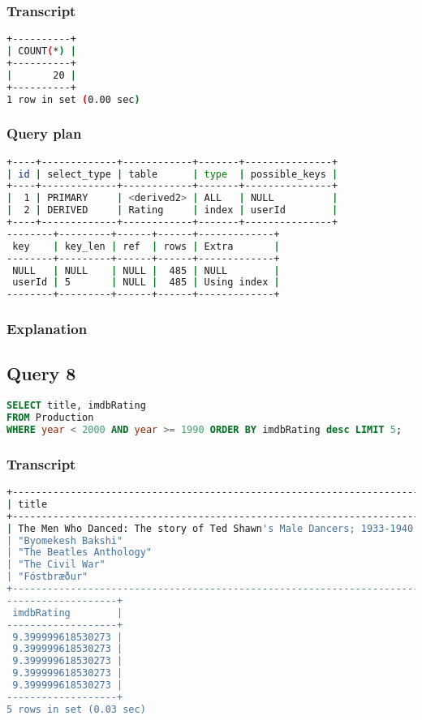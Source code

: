 \subsubsection{Transcript}
\begin{lstlisting}[language=bash]
+----------+
| COUNT(*) |
+----------+
|       20 |
+----------+
1 row in set (0.00 sec)
\end{lstlisting}

\subsubsection{Query plan}
\begin{lstlisting}[language=bash]
+----+-------------+------------+-------+---------------+
| id | select_type | table      | type  | possible_keys |
+----+-------------+------------+-------+---------------+
|  1 | PRIMARY     | <derived2> | ALL   | NULL          |
|  2 | DERIVED     | Rating     | index | userId        |
+----+-------------+------------+-------+---------------+
--------+---------+------+------+-------------+
 key    | key_len | ref  | rows | Extra       |
--------+---------+------+------+-------------+
 NULL   | NULL    | NULL |  485 | NULL        |
 userId | 5       | NULL |  485 | Using index |
--------+---------+------+------+-------------+
\end{lstlisting}

\subsubsection{Explanation}


\subsection{Query 8}
\begin{lstlisting}[language=sql]
SELECT title, imdbRating
FROM Production
WHERE year < 2000 AND year >= 1990 ORDER BY imdbRating desc LIMIT 5;
\end{lstlisting}

\subsubsection{Transcript}
\begin{lstlisting}[language=bash]
+----------------------------------------------------------------------+
| title                                                                |
+----------------------------------------------------------------------+
| The Men Who Danced: The story of Ted Shawn's Male Dancers; 1933-1940 |
| "Byomekesh Bakshi"                                                   |
| "The Beatles Anthology"                                              |
| "The Civil War"                                                      |
| "Fóstbræður"                                                         |
+----------------------------------------------------------------------+
-------------------+
 imdbRating        |
-------------------+
 9.399999618530273 |
 9.399999618530273 |
 9.399999618530273 |
 9.399999618530273 |
 9.399999618530273 |
-------------------+
5 rows in set (0.03 sec)
\end{lstlisting}

